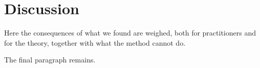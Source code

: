 \documentclass{article}
\begin{document}
\section{Discussion}
Here the consequences of what we found are weighed, both for practitioners
and for the theory, together with what the method cannot do.

The final paragraph remains.
\end{document}
